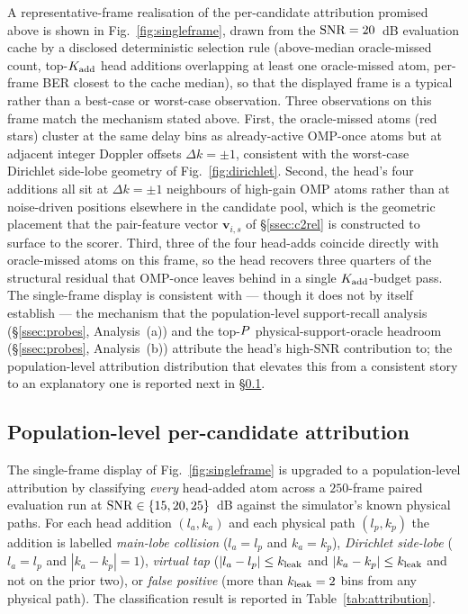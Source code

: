 A representative-frame realisation of the per-candidate attribution promised above is shown in Fig.~\ref{fig:singleframe}, drawn from the $\mathrm{SNR} = 20$~dB evaluation cache by a disclosed deterministic selection rule (above-median oracle-missed count, top-$K_{\mathrm{add}}$ head additions overlapping at least one oracle-missed atom, per-frame BER closest to the cache median), so that the displayed frame is a typical rather than a best-case or worst-case observation. Three observations on this frame match the mechanism stated above. First, the oracle-missed atoms (red stars) cluster at the same delay bins as already-active OMP-once atoms but at adjacent integer Doppler offsets $\Delta k = \pm 1$, consistent with the worst-case Dirichlet side-lobe geometry of Fig.~\ref{fig:dirichlet}. Second, the head's four additions all sit at $\Delta k = \pm 1$ neighbours of high-gain OMP atoms rather than at noise-driven positions elsewhere in the candidate pool, which is the geometric placement that the pair-feature vector $\mathbf{v}_{i,s}$ of \S\ref{ssec:c2rel} is constructed to surface to the scorer. Third, three of the four head-adds coincide directly with oracle-missed atoms on this frame, so the head recovers three quarters of the structural residual that OMP-once leaves behind in a single $K_{\mathrm{add}}$-budget pass. The single-frame display is consistent with --- though it does not by itself establish --- the mechanism that the population-level support-recall analysis (\S\ref{ssec:probes}, Analysis~(a)) and the top-$P$ physical-support-oracle headroom (\S\ref{ssec:probes}, Analysis~(b)) attribute the head's high-SNR contribution to; the population-level attribution distribution that elevates this from a consistent story to an explanatory one is reported next in \S\ref{ssec:disc_attribution}.

\subsection{Population-level per-candidate attribution}
\label{ssec:disc_attribution}

The single-frame display of Fig.~\ref{fig:singleframe} is upgraded to a population-level attribution by classifying \emph{every} head-added atom across a $250$-frame paired evaluation run at $\mathrm{SNR} \in \{15, 20, 25\}$~dB against the simulator's known physical paths. For each head addition $(l_a, k_a)$ and each physical path $(l_p, k_p)$ the addition is labelled \emph{main-lobe collision} ($l_a = l_p$ and $k_a = k_p$), \emph{Dirichlet side-lobe} ($l_a = l_p$ and $|k_a - k_p| = 1$), \emph{virtual tap} ($|l_a - l_p| \le k_{\mathrm{leak}}$ and $|k_a - k_p| \le k_{\mathrm{leak}}$ and not on the prior two), or \emph{false positive} (more than $k_{\mathrm{leak}} = 2$ bins from any physical path). The classification result is reported in Table~\ref{tab:attribution}.

